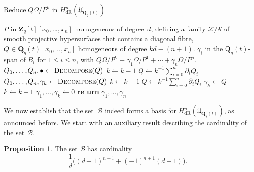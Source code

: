 \documentclass[a4paper,11pt]{article}
\numberwithin{equation}{section}
\newcommand{\ZZ}{\mathbf{Z}} %
\newcommand{\QQ}{\mathbf{Q}} %
\providecommand{\HdR}{H_{\text{dR}}}    %
\providecommand{\cB}{\mathcal{B}} %
\theoremstyle{definition}
\newtheorem{prop}[thm]{Proposition}
\begin{document}
\begin{algorithm}
\caption{Reduce $Q \Omega / P^k$ in $\HdR^n(\mathfrak{U}_{\QQ_q(t)})$}
\label{alg:PoleRed}
\begin{algorithmic}
\vspace{1mm}
\Require $P$ in $\ZZ_q[t][x_0, \dotsc, x_n]$ homogeneous of degree~$d$, 
         defining a family $\mathcal{X}/\mathcal{S}$ of smooth projective 
         hypersurfaces that contains a diagonal fibre, $Q \in \QQ_q(t)[x_0, \dotsc, x_n]$ 
         homogeneous of degree $kd - (n+1)$.
\Ensure  $\gamma_i$ in the $\QQ_q(t)$-span of $B_i$ for $1 \leq i \leq n$, with  
         $Q \Omega / P^k \equiv \gamma_{1} \Omega / P^{1} + \dotsb + \gamma_n \Omega / P^n$.
\State $Q_0, \dotsc, Q_n, \bullet \gets \Call{Decompose}{Q}$
\State $k \gets k-1$
\State $Q \gets k^{-1} \sum_{i=0}^n \partial_i Q_i$
\EndWhile
\While{$Q \not \in \QQ_q(t)$-span of $B_k$}
\State $Q_0, \dotsc, Q_n, \gamma_k \gets \Call{Decompose}{Q}$
\State $k \gets k-1$
\State $Q \gets k^{-1} \sum_{i=0}^n \partial_i Q_i$
\EndWhile
{}
\State $\gamma_{k} \gets Q$
\State $k \gets k-1$
\EndIf
\State $\gamma_{1}, \dotsc, \gamma_{k} \gets 0$
\State \textbf{return} $\gamma_{1}, \dotsc, \gamma_n$
\EndProcedure
\end{algorithmic}
\end{algorithm}

We now establish that the set~$\cB$ indeed forms a basis for 
$\HdR^n(\mathfrak{U}_{\QQ_q(t)})$, as announced before.  We start with an 
auxiliary result describing the cardinality of the set~$\cB$.

\begin{prop} \label{prop:BasisSize}
The set $\cB$ has cardinality
\begin{equation*}
\frac{1}{d} \bigl((d-1)^{n+1} + (-1)^{n+1}(d-1) \bigr).
\end{equation*}
\end{prop}
\end{document}
